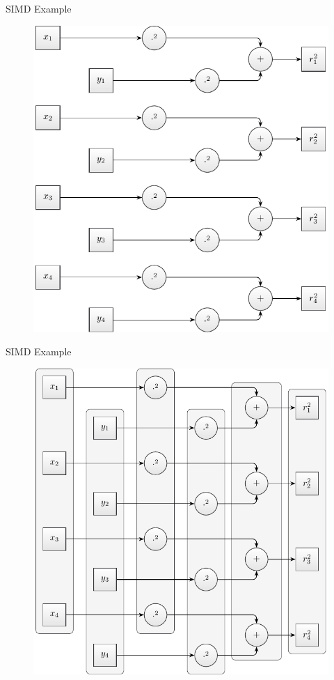 \documentclass[aspectratio=169]{beamer}
\begin{document}
    \begin{frame}{SIMD Example}
      \begin{figure}
        \includegraphics[scale=0.6]{figures/radius_operation_x4.pdf}
      \end{figure}
    \end{frame}

    \begin{frame}{SIMD Example}
      \begin{figure}
        \includegraphics[scale=0.6]{figures/radius_operation_simd.pdf}
      \end{figure}
    \end{frame}
\end{document}
